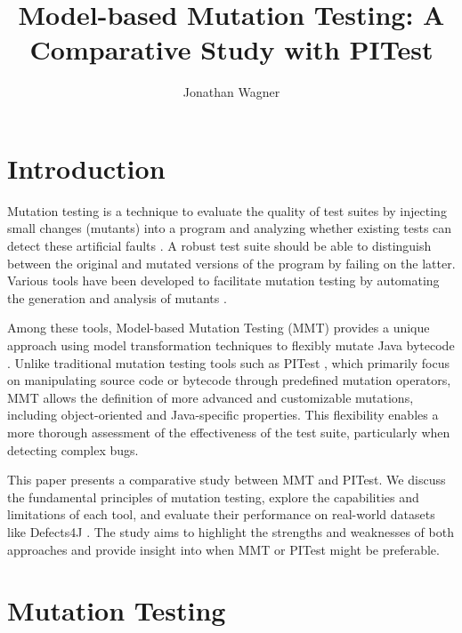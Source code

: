\documentclass[sigplan, nonacm]{acmart}
\begin{document}
\title{Model-based Mutation Testing: A Comparative Study with PITest}

\author{Jonathan Wagner}

\maketitle

\section{Introduction}
Mutation testing is a technique to evaluate the quality of test suites by injecting small changes (mutants) into a program and analyzing whether existing tests can detect these artificial faults \cite{offutt_mutation_2001}. A robust test suite should be able to distinguish between the original and mutated versions of the program by failing on the latter. Various tools have been developed to facilitate mutation testing by automating the generation and analysis of mutants \cite{coles_pit_2016}.

Among these tools, Model-based Mutation Testing (MMT) provides a unique approach using model transformation techniques to flexibly mutate Java bytecode \cite{bockisch_mmt_2024, bockisch_mutation_2024}. Unlike traditional mutation testing tools such as PITest \cite{coles_pit_2016}, which primarily focus on manipulating source code or bytecode through predefined mutation operators, MMT allows the definition of more advanced and customizable mutations, including object-oriented and Java-specific properties. This flexibility enables a more thorough assessment of the effectiveness of the test suite, particularly when detecting complex bugs.

This paper presents a comparative study between MMT and PITest. We discuss the fundamental principles of mutation testing, explore the capabilities and limitations of each tool, and evaluate their performance on real-world datasets like Defects4J \cite{just_defects4j_2014}. The study aims to highlight the strengths and weaknesses of both approaches and provide insight into when MMT or PITest might be preferable.

\section{Mutation Testing}
\end{document}
